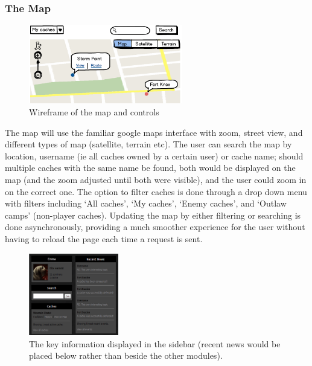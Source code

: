 \subsubsection{The Map}

\begin{figure}
\vspace{-40pt}
	\begin{center}
	\includegraphics[width=0.6\textwidth]{images/map_wireframe}
	\caption{Wireframe of the map and controls}
	\label{map_wireframe}
	\end{center}
	\vspace{-10pt}
\end{figure}

The map will use the familiar google maps interface with zoom, street view, and different types of map (satellite, terrain etc). The user can search the map by location, username (ie all caches owned by a certain user) or cache name; should multiple caches with the same name be found, both would be displayed on the map (and the zoom adjusted until both were visible), and the user could zoom in on the correct one. The option to filter caches is done through a drop down menu with filters including ‘All caches’, ‘My caches’, ‘Enemy caches’, and ‘Outlaw camps’ (non-player caches). Updating the map by either filtering or searching is done asynchronously, providing a much smoother experience for the user without having to reload the page each time a request is sent.

\begin{figure}
	\vspace{-20pt}
	\begin{center}
	\includegraphics[width=0.35\textwidth]{images/sidebar}
	\caption{The key information displayed in the sidebar (recent news would be placed below rather than beside the other modules).}
	\label{sidebar}
	\end{center}
	\vspace{-80pt}
\end{figure}

